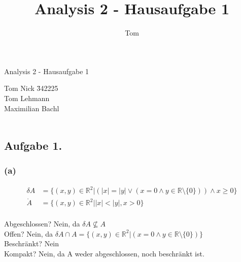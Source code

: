 \documentclass[10pt,a4paper]{article}
\author{Tom}
\title{Analysis 2 - Hausaufgabe 1}
\newcommand{\R}{\mathbb{R}}
\begin{document}
\begin{center}
\Large{Analysis 2 - Hausaufgabe 1} \\
\end{center}
\begin{tabbing}
Tom Nick \hspace{1.4cm}\= 342225\\
Tom Lehmann\\
Maximilian Bachl\\\\ 
\end{tabbing}
\subsection*{Aufgabe 1.}
\subsubsection*{\textbf{(a)}}
\begin{floatingfigure}[r]{150pt}
\end{floatingfigure}
\begin{align*}
\delta A &= \lbrace \left( x , y \right) \in \R ^2 | (|x| = |y| \lor (x = 0 \land y \in \R \setminus\lbrace0\rbrace)) \land x \geq 0 \rbrace \\
\mathring{A} &= \lbrace \left( x,y \right) \in \R ^2 | |x| < |y|, x > 0 \rbrace
\end{align*}\\
Abgeschlossen? Nein, da  $\delta A \not \subseteq A$\\
Offen? Nein, da $\delta A \cap A = \lbrace \left( x , y \right) \in \R ^2 |(x = 0 \land y \in \R \setminus \lbrace0\rbrace)\rbrace $\\
Beschränkt? Nein\\
Kompakt? Nein, da A weder abgeschlossen, noch beschränkt ist.\\
\end{document}
